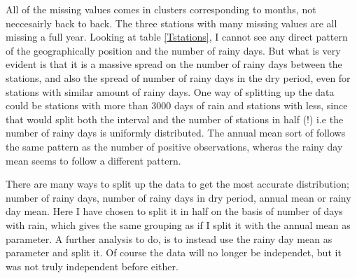 \documentclass{article}
\begin{document}
	All of the missing values comes in clusters corresponding to months, not neccesairly back to back. The three stations with many missing values are all missing a full year. Looking at table \ref{Tstations}, I cannot see any direct pattern of the geographically position and the number of rainy days. But what is very evident is that it is a massive spread on the number of rainy days between the stations, and also the spread of number of rainy days in the dry period, even for stations with similar amount of rainy days. One way of splitting up the data could be stations with more than 3000 days of rain and stations with less, since that would split both the interval and the number of stations in half (!) i.e the number of rainy days is uniformly distributed. The annual mean sort of follows the same pattern as the number of positive observations, wheras the rainy day mean seems to follow a different pattern.
	
	There are many ways to split up the data to get the most accurate distribution; number of rainy days, number of rainy days in dry period, annual mean or rainy day mean. Here I have chosen to split it in half on the basis of number of days with rain, which gives the same grouping as if I split it with the annual mean as parameter. A further analysis to do, is to instead use the rainy day mean as parameter and split it. Of course the data will no longer be independet, but it was not truly independent before either. 
	
\end{document}
